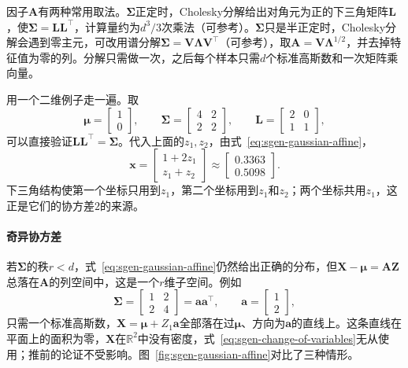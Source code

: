 因子$\bm{A}$有两种常用取法。$\bm{\Sigma}$正定时，Cholesky分解给出对角元为正的下三角矩阵$\bm{L}$，使$\bm{\Sigma}=\bm{L}\bm{L}^{\top}$，计算量约为$d^{3}/3$次乘法（可参考）。$\bm{\Sigma}$只是半正定时，Cholesky分解会遇到零主元，可改用谱分解$\bm{\Sigma}=\bm{V}\bm{\Lambda}\bm{V}^{\top}$（可参考），取$\bm{A}=\bm{V}\bm{\Lambda}^{1/2}$，并去掉特征值为零的列。分解只需做一次，之后每个样本只需$d$个标准高斯数和一次矩阵乘向量。

用一个二维例子走一遍。取
\[
  \bm{\mu}=\begin{bmatrix}1\\0\end{bmatrix},\qquad
  \bm{\Sigma}=\begin{bmatrix}4&2\\2&2\end{bmatrix},\qquad
  \bm{L}=\begin{bmatrix}2&0\\1&1\end{bmatrix},
\]
可以直接验证$\bm{L}\bm{L}^{\top}=\bm{\Sigma}$。代入上面的$z_1,z_2$，由式~\eqref{eq:sgen-gaussian-affine}，
\[
  \bm{x}=\begin{bmatrix}1+2z_1\\ z_1+z_2\end{bmatrix}\approx\begin{bmatrix}0.3363\\0.5098\end{bmatrix}.
\]
下三角结构使第一个坐标只用到$z_1$，第二个坐标用到$z_1$和$z_2$；两个坐标共用$z_1$，这正是它们的协方差$2$的来源。

\paragraph{奇异协方差}
若$\bm{\Sigma}$的秩$r<d$，式~\eqref{eq:sgen-gaussian-affine}仍然给出正确的分布，但$\bm{X}-\bm{\mu}=\bm{A}\bm{Z}$总落在$\bm{A}$的列空间中，这是一个$r$维子空间。例如
\[
  \bm{\Sigma}=\begin{bmatrix}1&2\\2&4\end{bmatrix}=\bm{a}\bm{a}^{\top},\qquad \bm{a}=\begin{bmatrix}1\\2\end{bmatrix},
\]
只需一个标准高斯数，$\bm{X}=\bm{\mu}+Z_1\bm{a}$全部落在过$\bm{\mu}$、方向为$\bm{a}$的直线上。这条直线在平面上的面积为零，$\bm{X}$在$\mathbb{R}^{2}$中没有密度，式~\eqref{eq:sgen-change-of-variables}无从使用；推前的论证不受影响。图~\ref{fig:sgen-gaussian-affine}对比了三种情形。

